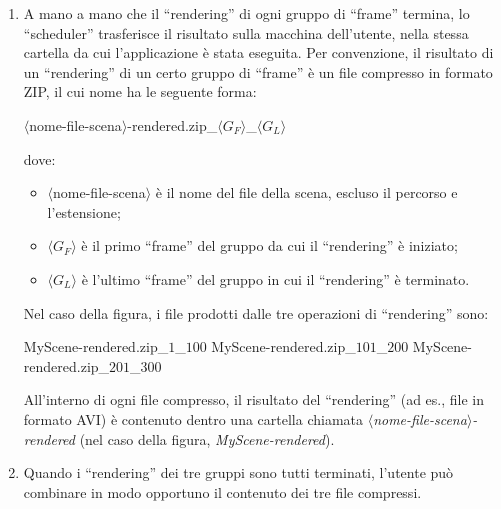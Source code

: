 \begin{enumerate}
\begin{itemize}
\item continuare a usare \mgTheApp{}, per monitorare lo stato di esecuzione del ``rendering'' o per sottomettere un nuovo ``rendering'';
\item usare l'interfaccia (testuale o grafica) dell'applicazione ``mygrid'' per monitorare lo stato di esecuzione del ``rendering'';
\item abbandonare la postazione di lavoro e controllare lo stato di esecuzione saltuariamente \footnote{L'applicazione ``mygrid'' deve per\`o rimanere in esecuzione sulla macchina dell'utente.}.
\end{itemize} 
\item A mano a mano che il ``rendering'' di ogni gruppo di ``frame'' termina, lo ``scheduler'' trasferisce il risultato sulla macchina dell'utente, nella stessa cartella da cui l'applicazione \mgTheApp{} \`e stata eseguita.
Per convenzione, il risultato di un ``rendering'' di un certo gruppo di ``frame'' \`e un file compresso in formato ZIP, il cui nome ha le seguente forma:
\begin{mgCodeBox}
$\langle$nome-file-scena$\rangle$-rendered.zip\_$\langle G_F \rangle$\_$\langle G_L \rangle$
\end{mgCodeBox} 
dove:
\begin{itemize}
\item $\langle$nome-file-scena$\rangle$ \`e il nome del file della scena, escluso il percorso e l'estensione;
\item $\langle G_F \rangle$ \`e il primo ``frame'' del gruppo da cui il ``rendering'' \`e iniziato;
\item $\langle G_L \rangle$ \`e l'ultimo ``frame'' del gruppo in cui il ``rendering'' \`e terminato.
\end{itemize}
Nel caso della figura, i file prodotti dalle tre operazioni di ``rendering'' sono:
\begin{mgCodeBox}
MyScene-rendered.zip\_$1$\_$100$ \newline
MyScene-rendered.zip\_$101$\_$200$ \newline
MyScene-rendered.zip\_$201$\_$300$
\end{mgCodeBox}
All'interno di ogni file compresso, il risultato del ``rendering'' (ad es., file in formato AVI) \`e contenuto dentro una cartella chiamata \emph{$\langle$nome-file-scena$\rangle$-rendered} (nel caso della figura, \emph{MyScene-rendered}).
\item Quando i ``rendering'' dei tre gruppi sono tutti terminati, l'utente pu\`o combinare in modo opportuno il contenuto dei tre file compressi.
\end{enumerate}

